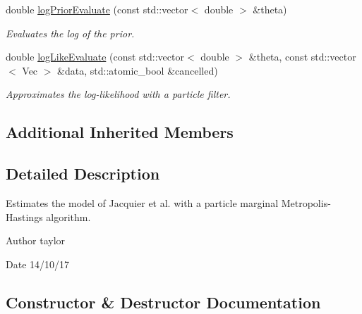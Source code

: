 \begin{DoxyCompactItemize}
double \hyperlink{classPmmh__jac__apf_ade139b7e8122a9cc37d4aae22e6ec752}{log\+Prior\+Evaluate} (const std\+::vector$<$ double $>$ \&theta)
\begin{DoxyCompactList}\small\item\em Evaluates the log of the prior. \end{DoxyCompactList}\item 
double \hyperlink{classPmmh__jac__apf_a34973f896a5fe11b04f93cc80ee54474}{log\+Like\+Evaluate} (const std\+::vector$<$ double $>$ \&theta, const std\+::vector$<$ Vec $>$ \&data, std\+::atomic\+\_\+bool \&cancelled)
\begin{DoxyCompactList}\small\item\em Approximates the log-\/likelihood with a particle filter. \end{DoxyCompactList}\end{DoxyCompactItemize}
\subsection*{Additional Inherited Members}


\subsection{Detailed Description}
Estimates the model of Jacquier et al. with a particle marginal Metropolis-\/\+Hastings algorithm. 

\begin{DoxyAuthor}{Author}
taylor 
\end{DoxyAuthor}
\begin{DoxyDate}{Date}
14/10/17 
\end{DoxyDate}


\subsection{Constructor \& Destructor Documentation}
